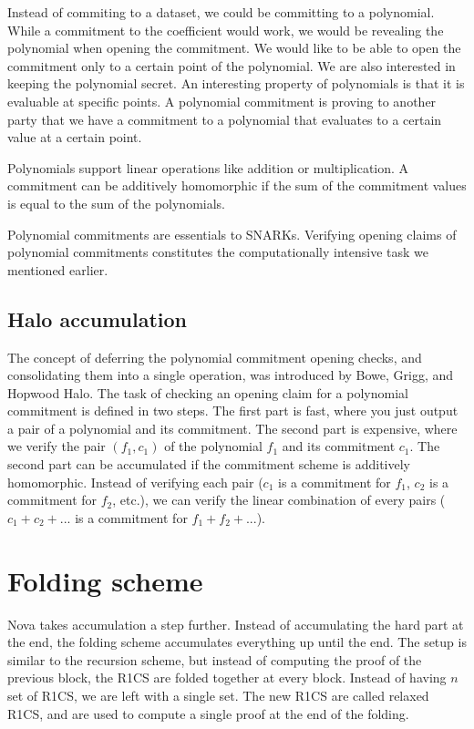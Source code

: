 Instead of commiting to a dataset, we could be committing to a polynomial. While a commitment to the coefficient would work, we would be revealing the polynomial
when opening the commitment. We would like to be able to open the commitment only to a certain point of the polynomial.
We are also interested in keeping the polynomial secret. An interesting property of polynomials is that it is evaluable at specific points.
A polynomial commitment is proving to another party that we have a commitment to a polynomial that evaluates to a certain value at a certain point.

Polynomials support linear operations like addition or multiplication. A commitment can be additively homomorphic if the sum of the commitment values
is equal to the sum of the polynomials.

Polynomial commitments are essentials to SNARKs. Verifying opening claims of polynomial commitments constitutes the computationally intensive task we mentioned earlier. \cite{VR23}

\subsection{Halo accumulation}

The concept of deferring the polynomial commitment opening checks, and consolidating them into a single operation, was introduced by Bowe, Grigg, and Hopwood Halo.\cite{BGH23}
The task of checking an opening claim for a polynomial commitment is defined in two steps.
The first part is fast, where you just output a pair of a polynomial and its commitment. The second part is expensive, where we verify the pair $(f_1, c_1)$ of the polynomial $f_1$ and its commitment $c_1$.
The second part can be accumulated if the commitment scheme is additively homomorphic.
Instead of verifying each pair ($c_1$ is a commitment for $f_1$, $c_2$ is a commitment for $f_2$, etc.), we can verify the linear combination of every pairs ($c_1+c_2+...$ is a commitment for $f_1+f_2+...$). \cite{VR23}

\section{Folding scheme}
Nova takes accumulation a step further. Instead of accumulating the hard part at the end, the folding scheme accumulates everything up until the end.
The setup is similar to the recursion scheme, but instead of computing the proof of the previous block, the R1CS are folded together at every block.
Instead of having $n$ set of R1CS, we are left with a single set. The new R1CS are called relaxed R1CS, and are used to compute a single proof at the end of the folding.
\cite{Nova23}  \cite{ASI23}


